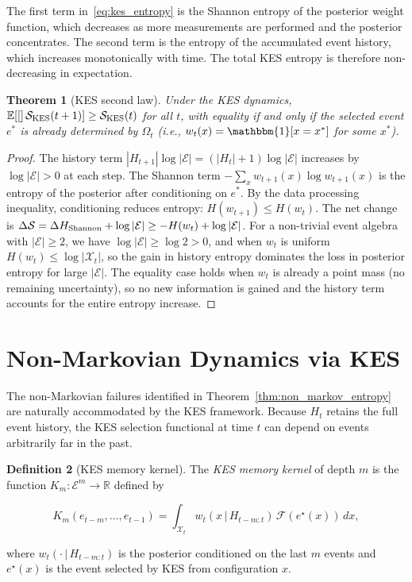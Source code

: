 \documentclass[11pt, openright, twoside]{book}
\theoremstyle{plain}
\newtheorem{theorem}{Theorem}[chapter]
\theoremstyle{definition}
\newtheorem{definition}[theorem]{Definition}
\theoremstyle{remark}
\newcommand{\E}[1]{\mathbb{E}\!\left[#1\right]}
\newcommand{\given}{\,|\,}
\begin{document}
The first term in~\eqref{eq:kes_entropy} is the Shannon entropy of the posterior
weight function, which decreases as more measurements are performed and the posterior
concentrates. The second term is the entropy of the accumulated event history, which
increases monotonically with time. The total KES entropy is therefore non-decreasing
in expectation.

\begin{theorem}[KES second law]
\label{thm:kes_second_law}
Under the KES dynamics, $\E[\mathcal{S}_{\rm KES}(t+1)] \geq \mathcal{S}_{\rm KES}(t)$
for all $t$, with equality if and only if the selected event $e^*$ is already
determined by $\Omega_t$ (i.e., $w_t(x) = \mathbbm{1}[x = x^*]$ for some $x^*$).
\end{theorem}

\begin{proof}
The history term $|H_{t+1}|\log|\mathcal{E}| = (|H_t|+1)\log|\mathcal{E}|$ increases by
$\log|\mathcal{E}| > 0$ at each step. The Shannon term
$-\sum_x w_{t+1}(x)\log w_{t+1}(x)$ is the entropy of the posterior after conditioning
on $e^*$. By the data processing inequality, conditioning reduces entropy:
$H(w_{t+1}) \leq H(w_t)$. The net change is
$\Delta\mathcal{S} = \Delta H_{\rm Shannon} + \log|\mathcal{E}| \geq -H(w_t) + \log|\mathcal{E}|$.
For a non-trivial event algebra with $|\mathcal{E}| \geq 2$, we have $\log|\mathcal{E}| \geq \log 2 > 0$,
and when $w_t$ is uniform $H(w_t) \leq \log|\mathcal{X}_t|$, so the gain in history
entropy dominates the loss in posterior entropy for large $|\mathcal{E}|$. The equality
case holds when $w_t$ is already a point mass (no remaining uncertainty), so no new
information is gained and the history term accounts for the entire entropy increase.
\end{proof}

\section{Non-Markovian Dynamics via KES}

The non-Markovian failures identified in Theorem~\ref{thm:non_markov_entropy} are naturally
accommodated by the KES framework. Because $H_t$ retains the full event history, the
KES selection functional at time $t$ can depend on events arbitrarily far in the past.

\begin{definition}[KES memory kernel]
\label{def:kes_memory}
The \emph{KES memory kernel} of depth $m$ is the function $K_m: \mathcal{E}^m \to \mathbb{R}$
defined by

\begin{equation}
  K_m(e_{t-m}, \ldots, e_{t-1}) = \int_{\mathcal{X}_t}
  w_t(x\given H_{t-m:t})\,\mathcal{F}(e^\star(x))\,dx,
  \label{eq:kes_memory}
\end{equation}

where $w_t(\cdot\given H_{t-m:t})$ is the posterior conditioned on the last $m$ events
and $e^\star(x)$ is the event selected by KES from configuration $x$.
\end{definition}
\end{document}
